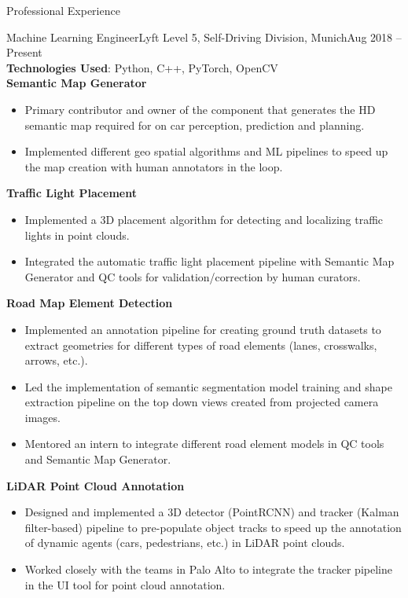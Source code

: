 \documentclass[]{mcdowellcv}
\begin{document}
	
	\makeheader
	
	
	\begin{cvsection}{Professional Experience}
		
		\begin{cvsubsection}{Machine Learning Engineer}{Lyft Level 5, Self-Driving Division, Munich}{Aug 2018 -- Present}   
			\textit{ } \\
			\textbf{Technologies Used}: Python, C++, PyTorch, OpenCV \\
			\textbf{Semantic Map Generator}
			\begin{itemize}
				\item Primary contributor and owner of the component that generates the HD semantic map required for on car perception, prediction and planning.
				\item Implemented different geo spatial algorithms and ML pipelines to speed up the map creation with human annotators in the loop.
			\end{itemize}
			
			\textbf{Traffic Light Placement}
			\begin{itemize}
				\item Implemented a 3D placement algorithm for detecting and localizing traffic lights in point clouds.
				\item Integrated the automatic traffic light placement pipeline with Semantic Map Generator and QC tools for validation/correction 
				by human curators.
			\end{itemize}
			
			\textbf{Road Map Element Detection}
			\begin{itemize}
				\item Implemented an annotation pipeline for creating ground truth datasets to extract geometries for different types of road elements (lanes, crosswalks, arrows, etc.).
				\item Led the implementation of semantic segmentation model training and shape extraction pipeline on the top down views created from projected camera images. 
				\item Mentored an intern to integrate different road element models in QC tools and Semantic Map Generator.
			\end{itemize}
			
			\textbf{LiDAR Point Cloud Annotation}
			\begin{itemize}
				\item Designed and implemented a 3D detector (PointRCNN) and tracker (Kalman filter-based) pipeline to pre-populate object tracks to speed up the annotation of dynamic agents (cars, pedestrians, etc.) in LiDAR point clouds.
				\item Worked closely with the teams in Palo Alto to integrate the tracker pipeline in the UI tool for point cloud annotation.
			\end{itemize}
			

\end{cvsubsection}
\end{cvsection}
\end{document}
